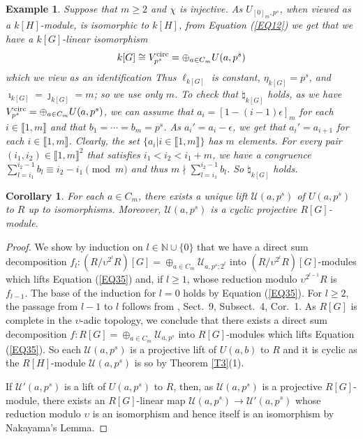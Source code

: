\documentclass[11pt]{amsart}
\newtheorem{corollary}[theorem]{Corollary}
\newtheorem{ex}[theorem]{Example}
\def\circul{\textup{circ}}
\begin{document}
\begin{ex}\normalfont\label{EX6}
Suppose that $m\ge 2$ and $\chi$ is injective. As $U_{[0]_m,p^s}$, when viewed as a $k[H]$-module, is isomorphic to $k[H]$, from Equation (\ref{EQ12}) we get that we have a $k[G]$-linear isomorphism
\begin{equation}\label{EQ35}
k[G]\cong V_{p^s}^{\circul}=\oplus_{a\in C_m} U(a,p^s)
\end{equation}
which we view as an identification
Thus $\ell_{k[G]}$ is constant, $\eta_{k[G]}=p^s$, and $\imath_{k[G]}=\jmath_{k[G]}=m$; so we use only $m$. To check that $\natural_{k[G]}$ holds, as we have $V_{p^s}^{\circul}=\oplus_{a\in C_m} U(a,p^s)$, we can assume that $a_i=[1-(i-1)\epsilon]_m$ for each $i\in\llbracket1,m\rrbracket$ and that $b_1=\cdots=b_m=p^s$. As $a_i'=a_i-\epsilon$, we get that $a_i'=a_{i+1}$ for each $i\in\llbracket1,m\rrbracket$. Clearly, the set $\{a_i|i\in\llbracket1,m\rrbracket\}$ has $m$ elements. For every pair $(i_1,i_2)\in\llbracket1,m\rrbracket^2$ that satisfies $i_1<i_2<i_1+m$, we have a congruence $\sum_{l=i_1}^{i_2-1} b_l\equiv i_2-i_1\pmod{m}$ and thus $m\nmid \sum_{l=i_1}^{i_2-1} b_l$. So $\natural_{k[G]}$ holds.
\end{ex}

\begin{corollary}\label{C2}
For each $a\in C_m$, there exists a unique lift $\mathcal U(a,p^s)$ of $U(a,p^s)$ to $R$ up to isomorphisms. Moreover, $\mathcal U(a,p^s)$ is a cyclic projective $R[G]$-module.
\end{corollary}

\begin{proof}
We show by induction on $l\in\mathbb N\cup\{0\}$ that we have a direct sum decomposition $f_l:(R/\upsilon^{2^l}R)[G]=\oplus_{a\in C_m} \mathcal U_{a,p^s;2^l}$ into $(R/\upsilon^{2^l}R)[G]$-modules which lifts Equation (\ref{EQ35}) and, if $l\ge 1$, whose reduction modulo $\upsilon^{2^{l-1}}R$ is $f_{l-1}$. The base of the induction for $l=0$ holds by Equation (\ref{EQ35}). For $l\ge 2$, the passage from $l-1$ to $l$ follows from \cite{Bo}, Sect.\ 9, Subsect.\ 4, Cor.\ 1. As $R[G]$ is complete in the $\upsilon$-adic topology, we conclude that there exists a direct sum decomposition $f:R[G]=\oplus_{a\in C_m} \mathcal U_{a,p^s}$ into $R[G]$-modules which lifts Equation (\ref{EQ35}). So each $\mathcal U(a,p^s)$ is a projective lift of $U(a,b)$ to $R$ and it is cyclic as the $R[H]$-module $\mathcal U(a,p^s)$ is so by Theorem \ref{T3}(1). 

If $\mathcal U'(a,p^s)$ is a lift of $U(a,p^s)$ to $R$, then, as $\mathcal U(a,p^s)$ is a projective $R[G]$-module, there exists an $R[G]$-linear map $\mathcal U(a,p^s)\rightarrow \mathcal U'(a,p^s)$ whose reduction modulo $\upsilon$ is an isomorphism and hence itself is an isomorphism by Nakayama's Lemma.
\end{proof}
\end{document}
